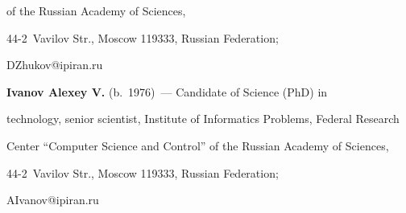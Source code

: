 of the Russian Academy of Sciences,  


44-2~Vavilov Str., Moscow 119333, Russian Federation;  


\mbox{DZhukov@ipiran.ru}





\vspace*{3pt}





\noindent


\textbf{Ivanov Alexey V.} (b.\ 1976)~--- Candidate of Science (PhD) in 


technology, senior scientist, Institute of Informatics Problems, Federal Research 


Center ``Computer Science and Control'' of the Russian Academy of Sciences,  


44-2~Vavilov Str., Moscow 119333, Russian Federation; 


\mbox{AIvanov@ipiran.ru}





\label{end\stat}





\renewcommand{\bibname}{\protect\rm Литература} 


